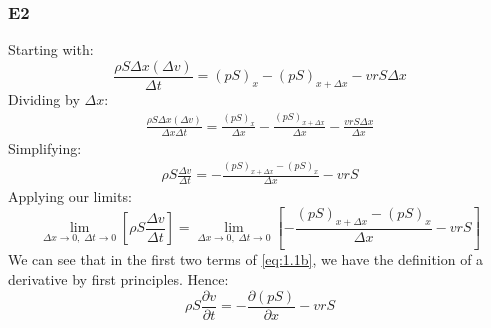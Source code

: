 \documentclass[11pt]{article}
\numberwithin{equation}{section}
\begin{document}
\subsubsection{E2}
Starting with:
\begin{equation}
    \frac{\rho S \Delta x \left(\Delta v\right)}{\Delta t} = \left(pS\right)_x - \left(pS\right)_{x+\Delta x} - vrS\Delta x
\end{equation}
Dividing by $\Delta x$:
\begin{gather}
    \frac{\rho S\Delta x\left(\Delta v\right)}{\Delta x \Delta t} = \frac{\left(pS\right)_x}{\Delta x} - \frac{\left(pS\right)_{x+\Delta x}}{\Delta x} - \frac{vrS\Delta x}{\Delta x}
\end{gather}
Simplifying:
\begin{gather}
    \rho S\frac{\Delta v}{\Delta t} = - \frac{\left(pS\right)_{x+\Delta x} - \left(pS\right)_x}{\Delta x} - vrS
\end{gather}
Applying our limits:
\begin{equation}
    \lim_{\Delta x \rightarrow 0, \; \Delta t \rightarrow 0} \left[ \rho S\frac{\Delta v}{\Delta t}\right] = \lim_{\Delta x \rightarrow 0, \; \Delta t \rightarrow 0} \left[ - \frac{\left(pS\right)_{x+\Delta x} - \left(pS\right)_x}{\Delta x} - vrS \right] \label{eq:1.1b}
\end{equation}
We can see that in the first two terms of \ref{eq:1.1b}, we have the definition of a derivative by first principles. Hence:
\begin{equation}
    \rho S \frac{\partial v}{\partial t} = - \frac{\partial \left(pS\right)}{\partial x} - vrS
\end{equation}
\end{document}
